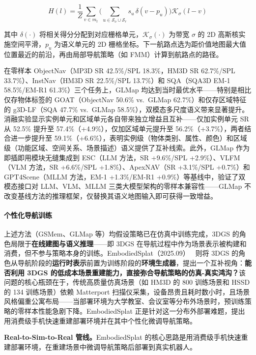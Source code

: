 \begin{equation}
H(l) = \frac{1}{Z}\sum_{v \in m_t}\Big(\sum_{u \in \mathcal{S}_o \cup \mathcal{S}_r} s_u\, \delta(v - p_u)\Big)\mathcal{K}_\sigma(l - v)
\end{equation}

其中 $\delta(\cdot)$ 将相关得分分配到对应栅格单元，$\mathcal{K}_\sigma(\cdot)$ 为带宽 $\sigma$ 的 2D 高斯核实施空间平滑，$p_u$ 为语义单元的 2D 栅格坐标。下一航路点选为距价值地图最大值位置最近的前沿，再由局部导航策略（如 FMM）计算到航路点的路径。

在零样本 ObjectNav（MP3D SR 42.5\%/SPL 18.3\%，HM3D SR 62.7\%/SPL 33.7\%）、InstNav（HM3D SR 22.5\%/SPL 13.7\%）和 SQA（SQA3D EM-1 58.5\%/EM-R1 61.3\%）三个任务上，GLMap 均达到当时最优水平——特别是相比仅存物体标签的 GOAT（ObjectNav 50.6\% vs.\ GLMap 62.7\%）和仅存区域特征的 g3D-LF（SQA 47.7\% vs.\ GLMap 58.5\%），双模态多尺度语义带来显著提升。消融实验显示实例单元和区域单元各自带来独立增益且互补——仅加实例单元 SR 从 52.5\% 提升至 57.4\%（+4.9\%），仅加区域单元提升至 56.2\%（+3.7\%），两者结合进一步提升至 59.1\%（+6.6\%），表明实例级（物体类别、属性、颜色）和区域级（功能区域、空间关系、场景描述）语义提供了互补线索。此外，GLMap 作为即插即用模块无缝集成到 ESC（LLM 方法，SR +9.6\%/SPL +2.9\%）、VLFM（VLM 方法，SR +6.6\%/SPL +1.8\%）、ApexNAV（SR +3.1\%/SPL +0.7\%）和 GPT4Scene（MLLM 方法，EM-1 +1.3\%/EM-R1 +0.9\%）等基线中，验证了双模态接口对 LLM、VLM、MLLM 三类大模型架构的零样本兼容性——GLMap 不改变基线方法的推理框架，仅替换其语义地图输入即可获得一致增益。

\paragraph{个性化导航训练}

上述方法（GSMem、GLMap 等）均假设策略已在仿真中训练完成，3DGS 的角色局限于\textbf{在线建图与语义推理}——即 3DGS 在导航过程中作为场景表示被构建和消费，但不参与策略本身的训练。EmbodiedSplat（2025.09）~\cite{2509_17430} 则将 3DGS 的角色从导航阶段的\textbf{运行时表示}前置为训练阶段的\textbf{环境生成器}，提出一个互补视角：\textbf{能否利用 3DGS 的低成本场景重建能力，直接弥合导航策略的仿真-真实鸿沟？}该问题的核心瓶颈在于，传统高质量仿真场景（如 HM3D 的 800 训练场景和 HSSD 的 134 训练场景）依赖 Matterport 扫描仪采集，设备昂贵且耗时数小时，且场景风格偏重公寓布局——当部署环境为大学教室、会议室等分布外场景时，预训练策略的零样本性能急剧下降。EmbodiedSplat 正是针对这一分布外部署难题，提出用消费级手机快速重建部署环境并在其中个性化微调导航策略。

\textbf{Real-to-Sim-to-Real 管线。}EmbodiedSplat 的核心思路是用消费级手机快速重建部署环境，在重建场景中微调导航策略后部署到真实机器人。

